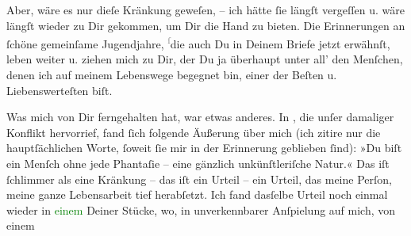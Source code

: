 \pstart
           Aber, wäre es nur {\pb}dieſe Kränkung geweſen, – ich
               hätte ſie längſt vergeſſen u. wäre längſt wieder zu Dir gekommen, um Dir die Hand zu
               bieten. Die Erinnerungen an ſchöne gemeinſame Jugendjahre, \substVorne{}\textsuperscript{\textcolor{gray}{ſ}}\substDazwischen{}d\substHinten{}ie auch Du in Deinem Briefe jetzt erwähnſt, leben weiter u. ziehen mich zu
               Dir, der Du ja überhaupt unter all’ den Menſchen, denen ich auf meinem Lebenswege
               begegnet bin, einer der Beſten u. Liebenswerteſten biſt.\pend
           
\pstart
           Was mich von Dir ferngehalten hat, war etwas anderes. In \label{K_L03478-6v}\label{K_L03478-6h}, die unſer damaliger Konflikt {\pb}hervorrief, fand ſich folgende Äußerung über mich (ich zitire nur die
               hauptſächlichen Worte, ſoweit ſie mir in der Erinnerung geblieben ſind): »Du biſt ein
               Menſch ohne jede Phantaſie – eine gänzlich unkünſtleriſche Natur.« Das iſt ſchlimmer
               als eine Kränkung – das iſt ein Urteil – ein Urteil, das meine Perſon, meine ganze
               Lebensarbeit tief herabſetzt. Ich fand dasſelbe Urteil noch einmal wieder in \textcolor{green}{einem}{}\ledrightnote{{$\rightarrow$}\textcolor{green}{Stunde des Erkennens}} Deiner Stücke, wo, in
               unverkennbarer Anſpielung auf mich, {\pb}von einem
